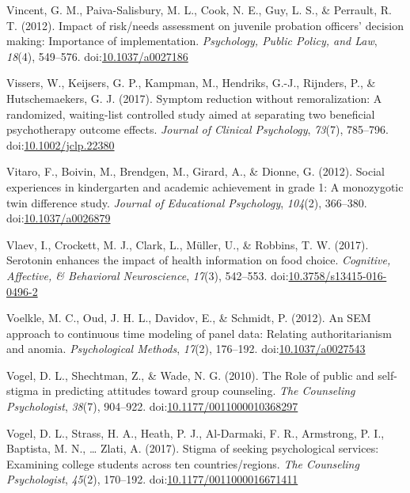 \documentclass[english,man]{apa6}
\theoremstyle{definition}
\theoremstyle{definition}
\theoremstyle{definition}
\theoremstyle{remark}
\begin{document}
\hypertarget{ref-Vincent2012}{}
Vincent, G. M., Paiva-Salisbury, M. L., Cook, N. E., Guy, L. S., \&
Perrault, R. T. (2012). Impact of risk/needs assessment on juvenile
probation officers' decision making: Importance of implementation.
\emph{Psychology, Public Policy, and Law}, \emph{18}(4), 549--576.
doi:\href{https://doi.org/10.1037/a0027186}{10.1037/a0027186}

\hypertarget{ref-Vissers2017}{}
Vissers, W., Keijsers, G. P., Kampman, M., Hendriks, G.-J., Rijnders,
P., \& Hutschemaekers, G. J. (2017). Symptom reduction without
remoralization: A randomized, waiting-list controlled study aimed at
separating two beneficial psychotherapy outcome effects. \emph{Journal
of Clinical Psychology}, \emph{73}(7), 785--796.
doi:\href{https://doi.org/10.1002/jclp.22380}{10.1002/jclp.22380}

\hypertarget{ref-Vitaro2012}{}
Vitaro, F., Boivin, M., Brendgen, M., Girard, A., \& Dionne, G. (2012).
Social experiences in kindergarten and academic achievement in grade 1:
A monozygotic twin difference study. \emph{Journal of Educational
Psychology}, \emph{104}(2), 366--380.
doi:\href{https://doi.org/10.1037/a0026879}{10.1037/a0026879}

\hypertarget{ref-Vlaev2017}{}
Vlaev, I., Crockett, M. J., Clark, L., Müller, U., \& Robbins, T. W.
(2017). Serotonin enhances the impact of health information on food
choice. \emph{Cognitive, Affective, \& Behavioral Neuroscience},
\emph{17}(3), 542--553.
doi:\href{https://doi.org/10.3758/s13415-016-0496-2}{10.3758/s13415-016-0496-2}

\hypertarget{ref-Voelkle2012}{}
Voelkle, M. C., Oud, J. H. L., Davidov, E., \& Schmidt, P. (2012). An
SEM approach to continuous time modeling of panel data: Relating
authoritarianism and anomia. \emph{Psychological Methods}, \emph{17}(2),
176--192. doi:\href{https://doi.org/10.1037/a0027543}{10.1037/a0027543}

\hypertarget{ref-Vogel2010}{}
Vogel, D. L., Shechtman, Z., \& Wade, N. G. (2010). The Role of public
and self-stigma in predicting attitudes toward group counseling.
\emph{The Counseling Psychologist}, \emph{38}(7), 904--922.
doi:\href{https://doi.org/10.1177/0011000010368297}{10.1177/0011000010368297}

\hypertarget{ref-Vogel2017}{}
Vogel, D. L., Strass, H. A., Heath, P. J., Al-Darmaki, F. R., Armstrong,
P. I., Baptista, M. N., \ldots{} Zlati, A. (2017). Stigma of seeking
psychological services: Examining college students across ten
countries/regions. \emph{The Counseling Psychologist}, \emph{45}(2),
170--192.
doi:\href{https://doi.org/10.1177/0011000016671411}{10.1177/0011000016671411}
\end{document}
